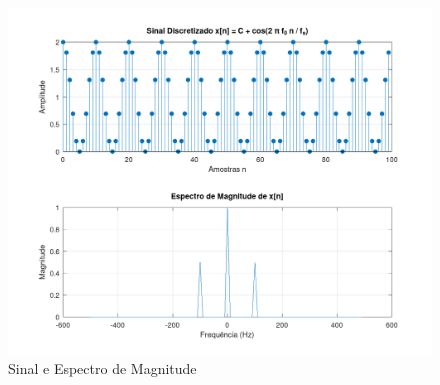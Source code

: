 
\begin{figure}[H]
    \centering
    \includegraphics[width=1\linewidth]{02_analytic_development/example_fft.png}
    \caption{Sinal e Espectro de Magnitude}
    \label{fig:enter-label}
\end{figure}